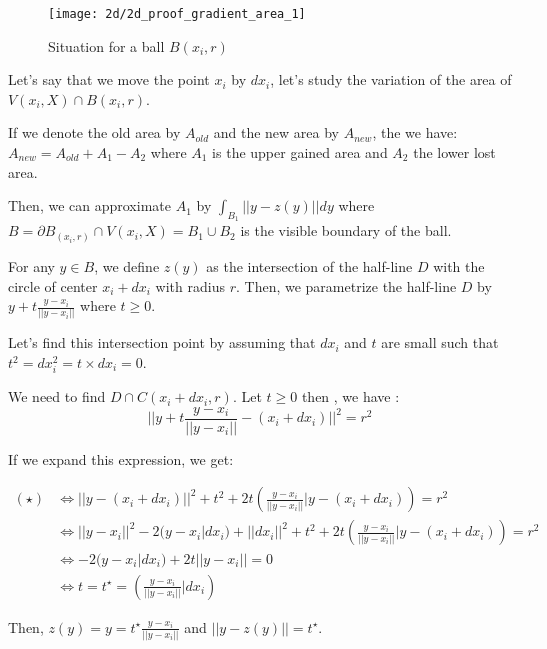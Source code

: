 
\begin{figure}[H]
    \centering
    \texttt{[image: 2d/2d\_proof\_gradient\_area\_1]}
    \caption{Situation for a ball $ B(x_i, r) $}
\end{figure}

Let's say that we move the point $ x _i $ by $ dx_i $, let's study the variation
of the area of $ V(x_i, X) \cap B(x_i, r) $.

If we denote the old area by $ A_{old} $ and the new area by $ A_{new} $, the we
have: $ A_{new} = A_{old} + A_1 - A_2 $ where $ A_1 $ is the upper gained area
and $ A_2 $ the lower lost area.

Then, we can approximate $ A_1 $ by $ \int_{B_1} || y - z(y) || dy $ where $ B =
\partial B_(x_i, r) \cap V(x_i, X) = B_1 \cup B_2 $ is the visible boundary of
the ball.

For any $ y \in B $, we define $ z(y) $ as the intersection of the half-line $ D $
with the circle of center $ x_i + dx_i $ with radius $ r $.
Then, we parametrize the half-line $ D $ by $ y + t \frac{y - x_i}{||y - x_i||}
$ where $ t \ge 0 $.

Let's find this intersection point by assuming that $ dx_i $ and $ t $ are small
such that $ t^2 = dx_i^2 = t \times dx_i = 0 $.

We need to find $ D \cap C(x_i + dx_i, r) $. Let $ t \ge 0 $ then , we have :
\begin{equation}
    || y + t \frac{y - x_i}{|| y - x_i||} - (x_i + dx_i) ||^2 = r^2
    \tag{$\star$}
\end{equation}

If we expand this expression, we get:

\begin{align*}
    (\star) & \iff || y
    - (x_i + dx_i) ||^2 + t^2 + 2t \left( \frac{y-x_i}{|| y - x_i||} | y - (x_i
        + dx_i) \right) = r^2 \\
    & \iff || y - x_i || ^2 - 2 (y - x_i | dx_i) + || dx_i || ^2 + t^2 + 2t
    \left( \frac{y-x_i}{|| y - x_i||} | y - (x_i + dx_i) \right) = r^2 \\
    & \iff -2 (y - x_i | dx_i) + 2t || y - x_i|| = 0 \\
    & \iff t = t^{\star} = \left( \frac{y - x_i}{||y - x_i||} | dx_i \right)
\end{align*}

Then, $ z(y) = y = t^{\star} \frac{y - x_i}{||y - x_i||} $ and $ || y - z(y) || =
t^{\star} $.

